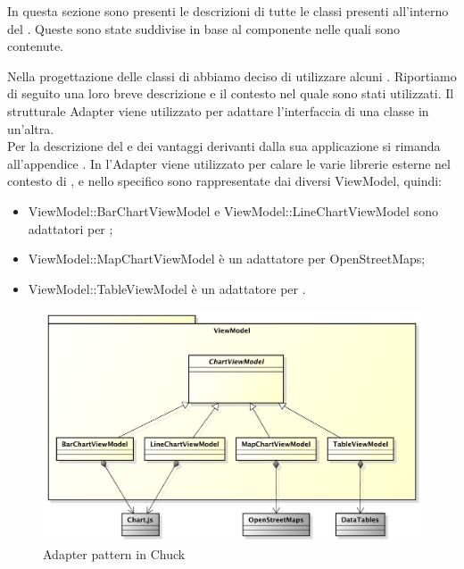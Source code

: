 		In questa sezione sono presenti le descrizioni di tutte le classi presenti all'interno del  . Queste sono state suddivise in base al componente nelle quali sono contenute.
		
		
	
		Nella progettazione delle classi di  abbiamo deciso di utilizzare alcuni . Riportiamo di seguito una loro breve descrizione e il contesto nel quale sono stati utilizzati.
			Il  strutturale Adapter viene utilizzato per adattare l'interfaccia di una classe in un'altra.\\
			Per la descrizione del  e dei vantaggi derivanti dalla sua applicazione si rimanda all'appendice .
				In  l'Adapter viene utilizzato per calare le varie librerie esterne nel contesto di \projectname{}, e nello specifico sono rappresentate dai diversi ViewModel, quindi:
				\begin{itemize}
					\item ViewModel::BarChartViewModel e ViewModel::LineChartViewModel sono adattatori per ;
					\item ViewModel::MapChartViewModel è un adattatore per OpenStreetMaps;
					\item ViewModel::TableViewModel è un adattatore per .
				\end{itemize}
				  \begin{figure}[H]\centering
	        		\includegraphics[width=\textwidth]{SpecificaTecnica/Pics/DesignPatternChuck/Adapter}
	        		\caption{Adapter pattern in Chuck}
	    		\end{figure}
	    		
